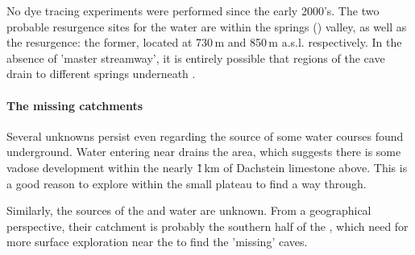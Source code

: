 No dye tracing experiments were performed since the early 2000's. The two probable resurgence sites for the  water are within the  springs () valley, as well as the  resurgence: the former, located at 730\,m and 850\,m a.s.l. respectively. In the absence of 'master streamway', it is entirely possible that regions of the cave drain to different springs underneath . 

\paragraph{The missing catchments}
Several unknowns persist even regarding the source of some water courses found underground. Water entering near  drains the  area, which suggests there is some vadose development within the nearly \~1\,km of Dachstein limestone above. This is a good reason to explore within the small  plateau to find a way through. 

Similarly, the sources of the  and  water are unknown. From a geographical perspective, their catchment is probably the southern half of the , which need for more surface exploration near the  to find the 'missing' caves. 


